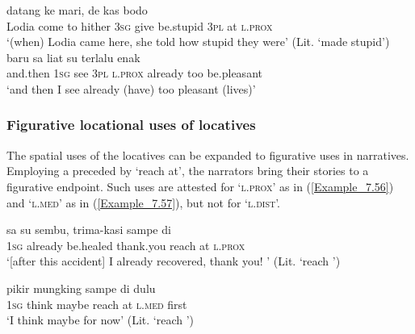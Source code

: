 {\ea
\label{Example_7.55}
\ea
\label{Example_7.55a}
 {datang} {ke} {mari,} {de} {kas} {bodo} {} {} {}\\ %
   Lodia  come  to  hither  \textsc{3sg}  give  be.stupid  \textsc{3pl}  at  \textsc{l.prox}\\
\glt ‘(when) Lodia came here, she told  how stupid they were’ (Lit. ‘made  stupid’) \textstyleExampleSource{[081115-001a-Cv.0136]}
\vspace{10pt}
\ex
\label{Example_7.55b}
\gll  baru  sa  liat      su  terlalu  enak\\
   and.then  \textsc{1sg}  see  \textsc{3pl}  \textsc{l.prox}  already  too  be.pleasant\\
 ‘and then I see  already (have) too pleasant (lives)’ \textstyleExampleSource{[081115-001a-Cv.0311]}\\
\z
\z

\subsubsection[Figurative {locational} uses of locatives]{Figurative {locational} uses of locatives}
\label{Para_7.2.2.2}
The spatial uses of the locatives can be expanded to figurative  uses in narratives. Employing a  preceded by  ‘reach at’, the narrators bring their stories to a figurative  endpoint. Such uses are attested for  ‘\textsc{l.prox}’ as in (\ref{Example_7.56}) and  ‘\textsc{l.med}’ as in (\ref{Example_7.57}), but not for  ‘\textsc{l.dist}’.

\ea
\label{Example_7.56}
\gll {\ldots} {sa} {su} {sembu,} {trima-kasi} {sampe} {di} {}\\ %
   { }  \textsc{1sg}  already  be.healed  thank.you  reach  at  \textsc{l.prox}\\
\glt 
‘[after this accident] I already recovered, thank you! ’ (Lit. ‘reach ’) \textstyleExampleSource{[081015-005-NP.0051]}
\z

\ea
\label{Example_7.57}
 {pikir} {mungking} {sampe} {di} {} {dulu}\\ %
 \textsc{1sg}  think  maybe  reach  at  \textsc{l.med}  first\\
\glt
‘I think maybe  for now’ (Lit. ‘reach ’) \textstyleExampleSource{[080919-004-NP.0083]}
\z


}

